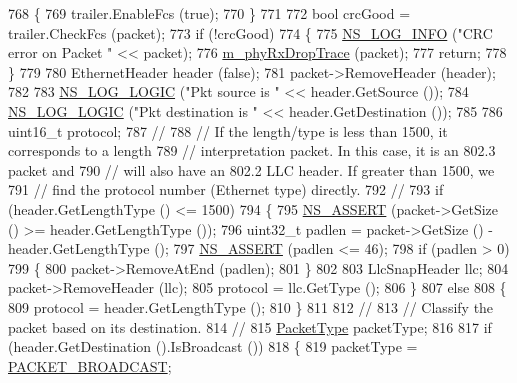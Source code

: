 \begin{DoxyCode}
768     \{
769       trailer.EnableFcs (\textcolor{keyword}{true});
770     \}
771 
772   \textcolor{keywordtype}{bool} crcGood = trailer.CheckFcs (packet);
773   \textcolor{keywordflow}{if} (!crcGood)
774     \{
775       \hyperlink{group__logging_gafbd73ee2cf9f26b319f49086d8e860fb}{NS\_LOG\_INFO} (\textcolor{stringliteral}{"CRC error on Packet "} << packet);
776       \hyperlink{classns3_1_1CsmaNetDevice_a9413b693a3028dcccb20f653bad58bc0}{m\_phyRxDropTrace} (packet);
777       \textcolor{keywordflow}{return};
778     \}
779 
780   EthernetHeader header (\textcolor{keyword}{false});
781   packet->RemoveHeader (header);
782 
783   \hyperlink{group__logging_ga88acd260151caf2db9c0fc84997f45ce}{NS\_LOG\_LOGIC} (\textcolor{stringliteral}{"Pkt source is "} << header.GetSource ());
784   \hyperlink{group__logging_ga88acd260151caf2db9c0fc84997f45ce}{NS\_LOG\_LOGIC} (\textcolor{stringliteral}{"Pkt destination is "} << header.GetDestination ());
785 
786   uint16\_t protocol;
787   \textcolor{comment}{//}
788   \textcolor{comment}{// If the length/type is less than 1500, it corresponds to a length }
789   \textcolor{comment}{// interpretation packet.  In this case, it is an 802.3 packet and }
790   \textcolor{comment}{// will also have an 802.2 LLC header.  If greater than 1500, we}
791   \textcolor{comment}{// find the protocol number (Ethernet type) directly.}
792   \textcolor{comment}{//}
793   \textcolor{keywordflow}{if} (header.GetLengthType () <= 1500)
794     \{
795       \hyperlink{assert_8h_a6dccdb0de9b252f60088ce281c49d052}{NS\_ASSERT} (packet->GetSize () >= header.GetLengthType ());
796       uint32\_t padlen = packet->GetSize () - header.GetLengthType ();
797       \hyperlink{assert_8h_a6dccdb0de9b252f60088ce281c49d052}{NS\_ASSERT} (padlen <= 46);
798       \textcolor{keywordflow}{if} (padlen > 0)
799         \{
800           packet->RemoveAtEnd (padlen);
801         \}
802 
803       LlcSnapHeader llc;
804       packet->RemoveHeader (llc);
805       protocol = llc.GetType ();
806     \}
807   \textcolor{keywordflow}{else}
808     \{
809       protocol = header.GetLengthType ();
810     \}
811 
812   \textcolor{comment}{//}
813   \textcolor{comment}{// Classify the packet based on its destination.}
814   \textcolor{comment}{//}
815   \hyperlink{classns3_1_1NetDevice_ace65153f09144f55a0d3e702fc29d6b2}{PacketType} packetType;
816 
817   \textcolor{keywordflow}{if} (header.GetDestination ().IsBroadcast ())
818     \{
819       packetType = \hyperlink{classns3_1_1NetDevice_ace65153f09144f55a0d3e702fc29d6b2adfeb6a2929cee183836a32fe293ce205}{PACKET\_BROADCAST};

\end{DoxyCode}
